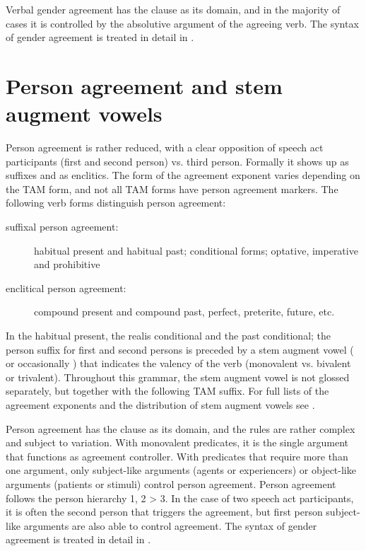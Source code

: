 Verbal gender agreement has the clause as its domain, and in the majority of cases it is controlled by the absolutive argument of the agreeing verb. The syntax of gender agreement is treated in detail in .



\section{Person agreement and stem augment vowels}
\label{sec:Stem augment vowels and person agreement}

Person agreement is rather reduced, with a clear opposition of speech act participants (first and second person) vs. third person. Formally it shows up as suffixes and as enclitics. The form of the agreement exponent varies depending on the TAM form, and not all TAM forms have person agreement markers. The following verb forms distinguish person agreement:
%
\begin{description}
	\item[suffixal person agreement:] habitual present and habitual past; conditional forms; optative, imperative and prohibitive
	\item[enclitical person agreement:] compound present and compound past, perfect, preterite, future, etc.
\end{description}
%
In the habitual present, the realis conditional and the past conditional; the person suffix for first and second persons is preceded by a stem augment vowel ( or occasionally ) that indicates the valency of the verb (monovalent vs. bivalent or trivalent). Throughout this grammar, the stem augment vowel is not glossed separately, but together with the following TAM suffix. For full lists of the agreement exponents and the distribution of stem augment vowels see .

Person agreement has the clause as its domain, and the rules are rather complex and subject to variation. With monovalent predicates, it is the single argument that functions as agreement controller. With predicates that require more than one argument, only subject-like arguments (agents or experiencers) or object-like arguments (patients or stimuli) control person agreement. Person agreement follows the person hierarchy 1, 2 > 3. In the case of two speech act participants, it is often the second person that triggers the agreement, but first person subject-like arguments are also able to control agreement. The syntax of gender agreement is treated in detail in .


